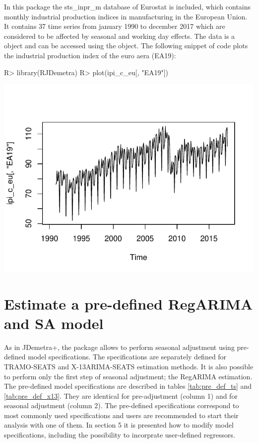 \documentclass[article]{jss}
\begin{document}
In this package the sts\_inpr\_m database of Eurostat is included, which
contains monthly industrial production indices in manufacturing in the
European Union. It contains 37 time series from january 1990 to december
2017 which are considered to be affected by seasonal and working day
effects. The data is a  object and can be accessed using the
 object. The following snippet of code plots the
industrial production index of the euro aera (EA19):

\begin{CodeChunk}

\begin{CodeInput}
R> library(RJDemetra)
R> plot(ipi_c_eu[, "EA19"])
\end{CodeInput}


\begin{center}\includegraphics{img/img-basic_raw_data_plot-1} \end{center}

\end{CodeChunk}

\hypertarget{estimate-a-pre-defined-regarima-and-sa-model}{%
\section{Estimate a pre-defined RegARIMA and SA
model}\label{estimate-a-pre-defined-regarima-and-sa-model}}

As in JDemetra+, the  package allows to perform seasonal
adjustment using pre-defined model specifications. The specifications
are separately defined for TRAMO-SEATS and X-13ARIMA-SEATS estimation
methods. It is also possible to perform only the first step of seasonal
adjustment; the RegARIMA estimation. The pre-defined model
specifications are described in tables \ref{tab:pre_def_ts} and
\ref{tab:pre_def_x13}. They are identical for pre-adjustment (column 1)
and for seasonal adjustment (column 2). The pre-defined specifications
correspond to most commonly used specifications and users are
recommended to start their analysis with one of them. In section 5 it is
presented how to modify model specifications, including the possibility
to incorprate user-defined regressors.
\end{document}
